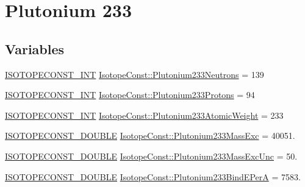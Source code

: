 \hypertarget{group___isotope_const-_plutonium-_pu233}{}\section{Plutonium 233}
\label{group___isotope_const-_plutonium-_pu233}
\subsection*{Variables}
\begin{DoxyCompactItemize}
\item 
\mbox{\hyperlink{group___isotope_const-_macros_ga5f18360b3e99483a35c32d789e62621c}{I\+S\+O\+T\+O\+P\+E\+C\+O\+N\+S\+T\+\_\+\+I\+NT}} \mbox{\hyperlink{group___isotope_const-_plutonium-_pu233_ga585879e69d9419b662f8f553b80fcfa5}{Isotope\+Const\+::\+Plutonium233\+Neutrons}} = 139
\item 
\mbox{\hyperlink{group___isotope_const-_macros_ga5f18360b3e99483a35c32d789e62621c}{I\+S\+O\+T\+O\+P\+E\+C\+O\+N\+S\+T\+\_\+\+I\+NT}} \mbox{\hyperlink{group___isotope_const-_plutonium-_pu233_ga7566791d02602706dc2bd27429c2dec0}{Isotope\+Const\+::\+Plutonium233\+Protons}} = 94
\item 
\mbox{\hyperlink{group___isotope_const-_macros_ga5f18360b3e99483a35c32d789e62621c}{I\+S\+O\+T\+O\+P\+E\+C\+O\+N\+S\+T\+\_\+\+I\+NT}} \mbox{\hyperlink{group___isotope_const-_plutonium-_pu233_gae8877361be9733e2cae3ac00cbd1febc}{Isotope\+Const\+::\+Plutonium233\+Atomic\+Weight}} = 233
\item 
\mbox{\hyperlink{group___isotope_const-_macros_ga8f45a7272ce02c0b4c65c44636ed719a}{I\+S\+O\+T\+O\+P\+E\+C\+O\+N\+S\+T\+\_\+\+D\+O\+U\+B\+LE}} \mbox{\hyperlink{group___isotope_const-_plutonium-_pu233_ga6a58aa528b9dc75bd7ae8c1ee442e5e7}{Isotope\+Const\+::\+Plutonium233\+Mass\+Exc}} = 40051.
\item 
\mbox{\hyperlink{group___isotope_const-_macros_ga8f45a7272ce02c0b4c65c44636ed719a}{I\+S\+O\+T\+O\+P\+E\+C\+O\+N\+S\+T\+\_\+\+D\+O\+U\+B\+LE}} \mbox{\hyperlink{group___isotope_const-_plutonium-_pu233_gab612f15febfc06eb0780b172472cb6e9}{Isotope\+Const\+::\+Plutonium233\+Mass\+Exc\+Unc}} = 50.
\item 
\mbox{\hyperlink{group___isotope_const-_macros_ga8f45a7272ce02c0b4c65c44636ed719a}{I\+S\+O\+T\+O\+P\+E\+C\+O\+N\+S\+T\+\_\+\+D\+O\+U\+B\+LE}} \mbox{\hyperlink{group___isotope_const-_plutonium-_pu233_ga35e9c0a89a039b7a766739585c100f28}{Isotope\+Const\+::\+Plutonium233\+Bind\+E\+PerA}} = 7583.
\item 

\end{DoxyCompactItemize}
